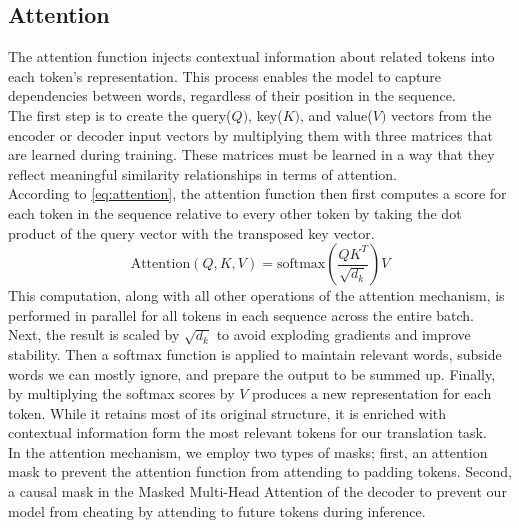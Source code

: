 \subsection{Attention} 
The attention function injects contextual information about related tokens into each token's representation.
This process enables the model to capture dependencies between words, regardless of their position in the sequence. \\
The first step is to create the query(\(Q)\), key(\(K)\), and value(\(V)\) vectors from the encoder or decoder input vectors by multiplying them with three matrices that are learned during training.
These matrices must be learned in a way that they reflect meaningful similarity relationships in terms of attention. \\
According to \cref{eq:attention}, the attention function then first computes a score for each token in the sequence relative to every other token by taking the dot product of the query vector with the transposed key vector. 
\begin{equation}
    \text{Attention}(Q,K,V) = \text{softmax}\left(\frac{QK^T}{\sqrt{d_k}}\right)V
    \label{eq:attention}
\end{equation}
This computation, along with all other operations of the attention mechanism, is performed in parallel for all tokens in each sequence across the entire batch.
Next, the result is scaled by \(\sqrt{d_k}\) to avoid exploding gradients and improve stability.
Then a softmax function is applied to maintain relevant words, subside words we can mostly ignore, and prepare the output to be summed up.
Finally, by multiplying the softmax scores by \(V\) produces a new representation for each token.
While it retains most of its original structure, it is enriched with contextual information form the most relevant tokens for our translation task. \\
In the attention mechanism, we employ two types of masks; first, an attention mask to prevent the attention function from attending to padding tokens.
Second, a causal mask in the Masked Multi-Head Attention of the decoder to prevent our model from cheating by attending to future tokens during inference.

